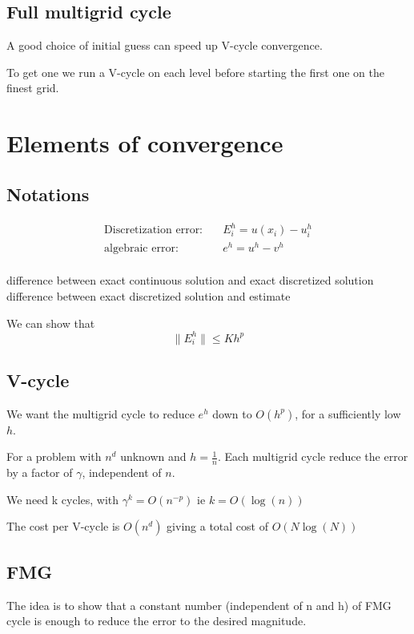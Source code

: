 \documentclass{article}
\begin{document}
\subsection{Full multigrid cycle}
A good choice of initial guess can speed up V-cycle convergence.

To get one we run a V-cycle on each level before starting the first one on the finest grid.

\section{Elements of convergence}

\subsection{Notations}

\begin{align*}
    \text{Discretization error:}       \quad & E^{h}_{i} = u(x_{i}) - u^{h}_{i} \\
    \text{algebraic error:}            \quad & e^{h} = u^{h} - v^{h} \\
\end{align*}

difference between exact continuous solution and exact discretized solution \\ 
difference between exact discretized solution and estimate

We can show that
\[
\|E^{h}_{i}\| \le Kh^{p}
\]

\subsection{V-cycle}

We want the multigrid cycle to reduce $e^{h}$ down to $ O(h^{p})$, for a sufficiently low $h$.

For a problem with $n^{d}$ unknown and $h = \frac{1}{n}$.
Each multigrid cycle reduce the error by a factor of $\gamma$, independent of $n$. %

We need k cycles, with $\gamma^{k} = O(n^{-p})$ ie $k = O(\log(n))$

The cost per V-cycle is $O(n^{d})$ giving a total cost of $ O(N\log(N))$

\subsection{FMG}

The idea is to show that a constant number (independent of n and h) of FMG cycle is enough to reduce the error to the desired magnitude.
\end{document}
